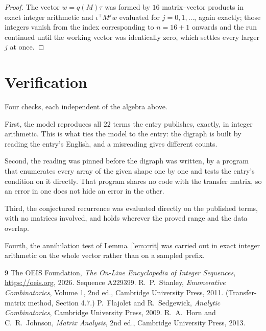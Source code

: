 \documentclass[11pt,a4paper]{article}
\theoremstyle{plain}
\theoremstyle{definition}
\begin{document}
\begin{proof}
The vector $w=q(M)\tau$ was formed by $16$ matrix--vector products in exact integer
arithmetic and $\iota^{\!\top}M^{j}w$ evaluated for $j=0,1,\dots$, again exactly; those
integers vanish from the index corresponding to $n=16+1$ onwards and the run continued
until the working vector was identically zero, which settles every larger $j$ at once.
\end{proof}

\section{Verification}

Four checks, each independent of the algebra above.

First, the model reproduces all $22$ terms the entry publishes, exactly, in integer
arithmetic. This is what ties the model to the entry: the digraph is built by reading the
entry's English, and a misreading gives different counts.

Second, the reading was pinned before the digraph was written, by a program that enumerates
every array of the given shape one by one and tests the entry's condition on it directly. That program shares no code with the transfer matrix, so an error in one does not
hide an error in the other.

Third, the conjectured recurrence was evaluated directly on the published terms, with no
matrices involved, and holds wherever the proved range and the data overlap.

Fourth, the annihilation test of Lemma~\ref{lem:crit} was carried out in exact integer
arithmetic on the whole vector rather than on a sampled prefix.

\begin{thebibliography}{9}
 The OEIS Foundation, \emph{The On-Line Encyclopedia of Integer
Sequences}, \url{https://oeis.org}, 2026. Sequence A229399.
 R.~P.~Stanley, \emph{Enumerative Combinatorics}, Volume 1, 2nd ed.,
Cambridge University Press, 2011. (Transfer-matrix method, Section 4.7.)
 P.~Flajolet and R.~Sedgewick, \emph{Analytic Combinatorics}, Cambridge
University Press, 2009.
 R.~A.~Horn and C.~R.~Johnson, \emph{Matrix Analysis}, 2nd ed., Cambridge
University Press, 2013.
\end{thebibliography}
\end{document}
